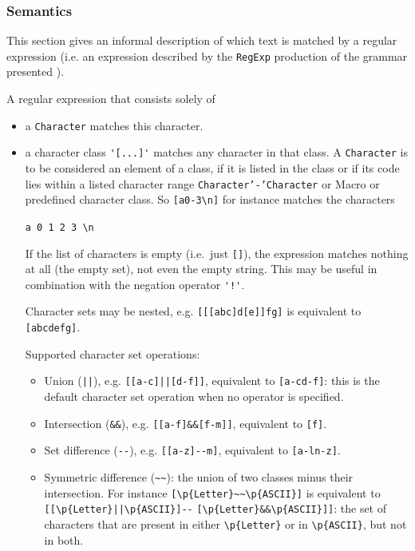 \documentclass[11pt]{scrartcl}
\begin{document}
\subsubsection{Semantics}\label{Semantics}
This section gives an informal description of which text is matched by
a regular expression (i.e. an expression described by the \texttt{RegExp}
production of the grammar presented ).

A regular expression that consists solely of
\begin{itemize}
\item
  a \texttt{Character} matches this character.

\item
  a character class \verb:'[...]': matches any character in that class.
  A \texttt{Character} is to be considered an element of a class, if it
  is listed in the class or if its code lies within a listed character
  range \texttt{Character'-'Character} or Macro or predefined character
  class. So \verb+[a0-3\n]+ for instance matches the characters

  \verb+a 0 1 2 3 \n+

  If the list of characters is empty (i.e.~just \verb+[]+), the expression
  matches nothing at all (the empty set), not even the empty string. This
  may be useful in combination with the negation operator \verb+'!'+.
  
  Character sets may be nested, e.g. \verb+[[[abc]d[e]]fg]+ is equivalent
  to \verb+[abcdefg]+.

  Supported character set operations:
    
  \begin{itemize}
  \item
    Union (\verb+||+), e.g. \verb+[[a-c]||[d-f]]+, equivalent to 
    \verb+[a-cd-f]+: this is the default character set operation when
    no operator is specified. 

  \item
    Intersection (\verb+&&+), e.g. \verb+[[a-f]&&[f-m]]+, equivalent to
    \verb+[f]+.
    
  \item
    Set difference (\verb+--+), e.g. \verb+[[a-z]--m]+, equivalent to
    \verb+[a-ln-z]+.
    
  \item
    Symmetric difference (\verb+~~+): the union of two classes minus their
    intersection. For instance \verb+[\p{Letter}~~\p{ASCII}]+ is equivalent
    to
    \verb+[[\p{Letter}||\p{ASCII}]--+
    \verb+[\p{Letter}&&\p{ASCII}]]+: the
    set of characters that are present in either \verb+\p{Letter}+ or
    in \verb+\p{ASCII}+, but not in both.


\end{itemize}
\end{itemize}
\end{document}
